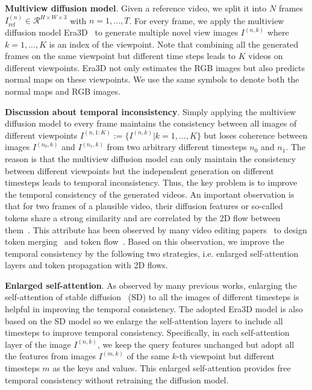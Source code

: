 \textbf{Multiview diffusion model}. Given a reference video, we split it into $N$ frames $I_{\text{ref}}^{(n)}\in \mathcal{R}^{H\times W\times 3}$ with $n=1,...,T$. For every frame, we apply the multiview diffusion model Era3D~\citep{li2024era3d} to generate multiple novel view images $I^{(n,k)}$ where $k=1,...,K$ is an index of the viewpoint. Note that combining all the generated frames on the same viewpoint but different time steps leads to $K$ videos on different viewpoints. Era3D not only estimates the RGB images but also predicts normal maps on these viewpoints. We use the same symbols to denote both the normal maps and RGB images.


\textbf{Discussion about temporal inconsistency}. Simply applying the multiview diffusion model to every frame maintains the consistency between all images of different viewpoints $I^{(n,1:K)}:=\{I^{(n,k)}|k=1,...,K\}$ but loses coherence between images $I^{(n_0,k)}$ and $I^{(n_1,k)}$ from two arbitrary different timesteps $n_0$ and $n_1$. The reason is that the multiview diffusion model can only maintain the consistency between different viewpoints but the independent generation on different timesteps leads to temporal inconsistency. Thus, the key problem is to improve the temporal consistency of the generated videos. An important observation is that for two frames of a plausible video, their diffusion features or so-called tokens share a strong similarity and are correlated by the 2D flow between them~\citep{geyer2023tokenflow}. This attribute has been observed by many video editing papers~\citep{geyer2023tokenflow,li2024vidtome} to design token merging~\citep{li2024vidtome} and token flow~\citep{geyer2023tokenflow}. Based on this observation, we improve the temporal consistency by the following two strategies, i.e. enlarged self-attention layers and token propagation with 2D flows.

\textbf{Enlarged self-attention}. As observed by many previous works, enlarging the self-attention of stable diffusion~\citep{rombach2022latentdiff} (SD) to all the images of different timesteps is helpful in improving the temporal consistency. The adopted Era3D model is also based on the SD model so we enlarge the self-attention layers to include all timesteps to improve temporal consistency. Specifically, in each self-attention layer of the image $I^{(n,k)}$, we keep the query features unchanged but adopt all the features from images $I^{(m,k)}$ of the same $k$-th viewpoint but different timesteps $m$ as the keys and values. This enlarged self-attention provides free temporal consistency without retraining the diffusion model.

